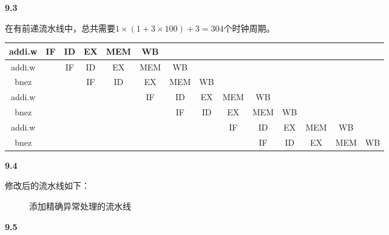 \documentclass[UTF8]{report}
\begin{document}
\begin{table}[H]
\end{table}

\noindent
\textbf{9.3}

在有前递流水线中，总共需要$1 \times (1 + 3 \times 100) + 3 = 304$个时钟周期。

\begin{table}[H]
    \centering
    \begin{tabular}{|c|c|c|c|c|c|c|c|c|c|c|c|c|c|}
    \hline
    addi.w&IF&ID&EX&MEM&WB&&&&&&&&\\
    \hline
    addi.w&&IF&ID&EX&MEM&WB&&&&&&&\\
    \hline
    bnez&&&IF&ID&EX&MEM&WB&&&&&&\\
    \hline
    addi.w&&&&&IF&ID&EX&MEM&WB&&&&\\
    \hline
    bnez&&&&&&IF&ID&EX&MEM&WB&&&\\
    \hline
    addi.w&&&&&&&&IF&ID&EX&MEM&WB&\\
    \hline
    bnez&&&&&&&&&IF&ID&EX&MEM&WB\\
    \hline
    \end{tabular}
\end{table}

\noindent
\textbf{9.4}

修改后的流水线如下：

\begin{figure}[H]
    \centering
    
    \caption{添加精确异常处理的流水线}
\end{figure}

\noindent
\textbf{9.5}
\end{document}
